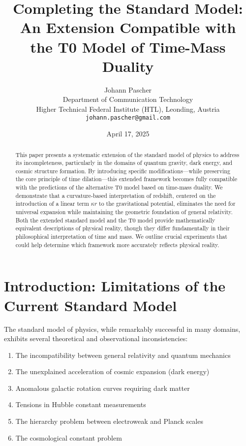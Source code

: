 \documentclass[12pt,a4paper]{article}
\title{Completing the Standard Model: An Extension Compatible with\\the T0 Model of Time-Mass Duality}
\author{Johann Pascher\\
	Department of Communication Technology\\
	Higher Technical Federal Institute (HTL), Leonding, Austria\\
	\texttt{johann.pascher@gmail.com}}
\date{April 17, 2025}
\begin{document}
	
	\maketitle
	
	\begin{abstract}
		This paper presents a systematic extension of the standard model of physics to address its incompleteness, particularly in the domains of quantum gravity, dark energy, and cosmic structure formation. By introducing specific modifications—while preserving the core principle of time dilation—this extended framework becomes fully compatible with the predictions of the alternative T0 model based on time-mass duality\cite{pascher_zeit_masse_2025}. We demonstrate that a curvature-based interpretation of redshift, centered on the introduction of a linear term $\kappa r$ to the gravitational potential, eliminates the need for universal expansion while maintaining the geometric foundation of general relativity. Both the extended standard model and the T0 model provide mathematically equivalent descriptions of physical reality, though they differ fundamentally in their philosophical interpretation of time and mass. We outline crucial experiments that could help determine which framework more accurately reflects physical reality.
	\end{abstract}
	
	\tableofcontents
	\newpage
	
	\section{Introduction: Limitations of the Current Standard Model}
	\label{sec:introduction}
	
	The standard model of physics, while remarkably successful in many domains, exhibits several theoretical and observational inconsistencies:
	
	\begin{enumerate}
		\item The incompatibility between general relativity\cite{einstein1915} and quantum mechanics\cite{schrodinger1926}
		\item The unexplained acceleration of cosmic expansion (dark energy)\cite{perlmutter1999}
		\item Anomalous galactic rotation curves requiring dark matter\cite{rubin1980}
		\item Tensions in Hubble constant measurements\cite{riess2019}
		\item The hierarchy problem between electroweak and Planck scales\cite{thooft1980}
		\item The cosmological constant problem\cite{weinberg1989}
	\end{enumerate}
	
\end{document}
